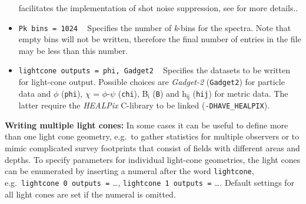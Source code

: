 \documentclass[a4paper,10pt]{article}
\begin{document}
\begin{itemize}
{facilitates the implementation of shot noise suppression, see \cite{Adamek:2016zes} for more details.}.
 \item[] \hspace{-25pt}\texttt{Pk bins = 1024} ~ Specifies the number of \textit{k}-bins for the spectra. Note that empty bins will not be
 written, therefore the final number of entries in the file may be less than this number.
 \item[] \hspace{-25pt}\texttt{lightcone outputs = phi, Gadget2} ~ Specifies the datasets to be written for light-cone output. Possible
 choices are \textit{Gadget-2} (\texttt{Gadget2}) for particle data and $\mathsf{\phi}$ (\texttt{phi}),
 $\mathsf{\chi}$ = $\mathsf{\phi}$-$\mathsf{\psi}$ (\texttt{chi}), B$_\mathsf{i}$ (\texttt{B}) and h$_\mathsf{ij}$ (\texttt{hij}) for metric data.
 The latter require the \textit{HEALPix} C-library to be linked (\texttt{-DHAVE\_HEALPIX}).
 \end{itemize}
\noindent\textbf{Writing multiple light cones:} In some cases it can be useful to define more than one light cone geometry, e.g.\ to gather statistics for
multiple observers or to mimic complicated survey footprints that consist of fields with different areas and depths. To specify parameters for individual
light-cone geometries, the light cones can be enumerated by inserting a numeral after the word \texttt{lightcone}, e.g.\ \texttt{lightcone 0 outputs =} \ldots,
\texttt{lightcone 1 outputs =} \ldots. Default settings for all light cones are set if the numeral is omitted.
\end{document}
